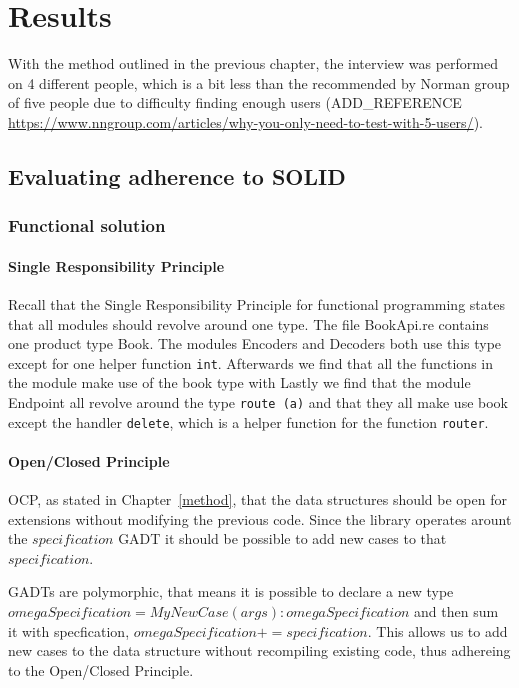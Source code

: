 \chapter{Results}\label{results}

With the method outlined in the previous chapter, the interview was performed on
4 different people, which is a bit less than the recommended by Norman group of
five people due to difficulty finding enough users
(ADD\_REFERENCE \url{https://www.nngroup.com/articles/why-you-only-need-to-test-with-5-users/}).

\section{Evaluating adherence to SOLID}

\subsection{Functional solution}
\subsubsection{Single Responsibility Principle}

Recall that the Single Responsibility Principle for functional programming
states that all modules should revolve around one type.  The file BookApi.re
contains one product type Book. The modules Encoders and Decoders both use this
type except for one helper function \texttt{int}.  Afterwards we find that all
the functions in the module make use of the book type with Lastly we find that
the module Endpoint all revolve around the type \texttt{route (a)} and that they
all make use book except the handler \texttt{delete}, which is a helper
function for the function \texttt{router}.

\subsubsection{Open/Closed Principle}

OCP, as stated in Chapter~\ref{method}, that the data structures should be open
for extensions without modifying the previous code. Since the library operates
arount the $specification$ GADT it should be possible to add new cases to 
that $specification$.

GADTs are polymorphic, that means it is possible to declare a new type
$omegaSpecification = MyNewCase(args): omegaSpecification$ and then sum it with
specfication, $omegaSpecification += specification$. This allows us to add new
cases to the data structure without recompiling existing code, thus adhereing to 
the Open/Closed Principle.

